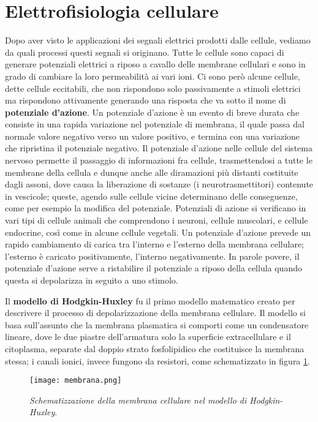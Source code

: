 \documentclass{report}
\newcommand{\figref}[1]{figura \ref{#1}}
\numberwithin{equation}{section}
\numberwithin{figure}{section}
\begin{document}
\section{Elettrofisiologia cellulare}
Dopo aver visto le applicazioni dei segnali elettrici prodotti dalle cellule, vediamo da quali processi questi segnali si originano. Tutte le cellule sono capaci di generare potenziali elettrici a riposo a cavallo delle membrane cellulari e sono in grado di cambiare la loro permeabilità ai vari ioni. Ci sono però alcune cellule, dette cellule eccitabili, che non rispondono solo passivamente a stimoli elettrici ma rispondono attivamente generando una risposta che va sotto il nome di \textbf{potenziale d’azione}. Un potenziale d'azione è un evento di breve durata che consiste in una rapida variazione nel potenziale di membrana, il quale passa dal normale valore negativo verso un valore positivo, e termina con una variazione che ripristina il potenziale negativo. Il potenziale d'azione nelle cellule del sistema nervoso permette il passaggio di informazioni fra cellule, trasmettendosi a tutte le membrane della cellula e dunque anche alle diramazioni più distanti costituite dagli assoni, dove causa la liberazione di sostanze (i neurotrasmettitori) contenute in vescicole; queste, agendo sulle cellule vicine determinano delle conseguenze, come per esempio la modifica del potenziale. Potenziali di azione si verificano in vari tipi di cellule animali che comprendono i neuroni, cellule muscolari, e cellule endocrine, così come in alcune cellule vegetali. Un potenziale d'azione prevede un rapido cambiamento di carica tra l'interno e l'esterno della membrana cellulare; l'esterno è caricato positivamente, l'interno negativamente. In parole povere, il potenziale d'azione serve a ristabilire il potenziale a riposo della cellula quando questa si depolarizza in seguito a uno stimolo.

Il \textbf{modello di Hodgkin-Huxley} fu il primo modello matematico creato per descrivere il processo di depolarizzazione della membrana cellulare. Il modello si basa sull'assunto che la membrana plasmatica si comporti come un condensatore lineare, dove le due piastre dell'armatura solo la superficie extracellulare e il citoplasma, separate dal doppio strato fosfolipidico che costituisce la membrana stessa; i canali ionici, invece fungono da resistori, come schematizzato in \figref{fig:membrana}.

\begin{figure}[htp]
    \centering
    \texttt{[image: membrana.png]}
    \caption{\label{fig:membrana} \textit{Schematizzazione della membrana cellulare nel modello di Hodgkin-Huxley}.}
\end{figure}
\end{document}
